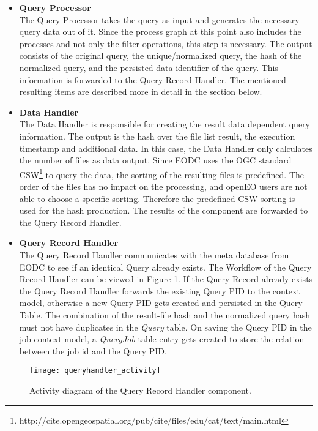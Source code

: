 \documentclass[draft,final]{vutinfth} %
\begin{document}
 \begin{itemize}
	\item \textbf{Query Processor} \\
	The Query Processor takes the query as input and generates the necessary query data out of it. Since the process graph at this point also includes the processes and not only the filter operations, this step is necessary. The output consists of the original query, the unique/normalized query, the hash of the normalized query, and the persisted data identifier of the query. This information is forwarded to the Query Record Handler. The mentioned resulting items are described more in detail in the section below.   
	\item \textbf{Data Handler} \\ 
	The Data Handler is responsible for creating the result data dependent query information. The output is the hash over the file list result, the execution timestamp and additional data. In this case, the Data Handler only calculates the number of files as data output. Since EODC uses the OGC standard CSW\footnote{http://cite.opengeospatial.org/pub/cite/files/edu/cat/text/main.html} to query the data, the sorting of the resulting files is predefined. The order of the files has no impact on the processing, and openEO users are not able to choose a specific sorting. Therefore the predefined CSW sorting is used for the hash production. The results of the component are forwarded to the Query Record Handler.    
	\item \textbf{Query Record Handler} \\
	The Query Record Handler communicates with the meta database from EODC to see if an identical Query already exists. The Workflow of the Query Record Handler can be viewed in Figure \ref{fig:queryhandler_activity}. If the Query Record already exists the Query Record Handler forwards the existing Query PID to the context model, otherwise a new Query PID gets created and persisted in the Query Table. The combination of the result-file hash and the normalized query hash must not have duplicates in the \textit{Query} table. On saving the Query PID in the job context model, a \textit{QueryJob} table entry gets created to store the relation between the job id and the Query PID. 
	
\end{itemize}

\begin{figure}[h]
	\centering
	\texttt{[image: queryhandler\_activity]}
	\caption{Activity diagram of the Query Record Handler component.}
	\label{fig:queryhandler_activity} %
\end{figure}
\end{document}
